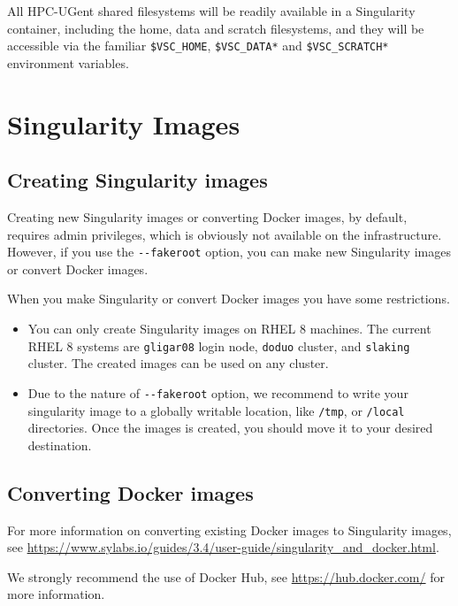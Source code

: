All HPC-UGent shared filesystems will be readily available in a Singularity container,
including the home, data and scratch filesystems, and they will be accessible via the
familiar \lstinline|$VSC_HOME|, \lstinline|$VSC_DATA*| and \lstinline|$VSC_SCRATCH*| environment variables.

\section{Singularity Images}

\subsection{Creating Singularity images}

Creating new Singularity images or converting Docker images, by default, requires admin privileges,
which is obviously not available on the \hpcInfra infrastructure. However,
if you use the \lstinline|--fakeroot| option, you can make new Singularity images or convert 
Docker images. 

When you make Singularity or convert Docker images you have some restrictions.

\begin{itemize}
    \item You can only create Singularity images on RHEL 8 machines. The current RHEL 8 systems are
        \lstinline|gligar08| login node, \lstinline|doduo| cluster, and \lstinline|slaking| cluster.
        The created images can be used on any cluster.
    \item Due to the nature of \lstinline|--fakeroot| option, we recommend to write your singularity 
        image to a globally writable location, like \lstinline|/tmp|, or \lstinline|/local| directories. 
        Once the images is created, you should move it to your desired destination.
\end{itemize}

\subsection{Converting Docker images}

For more information on converting existing Docker images to Singularity images,
see \url{https://www.sylabs.io/guides/3.4/user-guide/singularity_and_docker.html}.

We strongly recommend the use of Docker Hub, see \url{https://hub.docker.com/} for more information.

